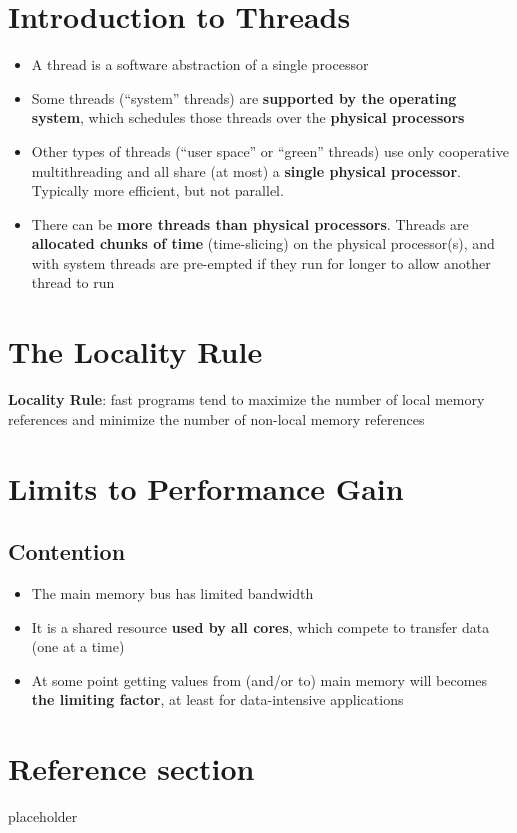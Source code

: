 \documentclass{article}
\begin{document}
\tableofcontents

\newpage

\section{Introduction to Threads}
\begin{itemize}
  \item A thread is a software abstraction of a single processor
  \item Some threads (“system” threads) are \textbf{supported by the operating system}, which schedules those threads over the \textbf{physical processors}
  \item Other types of threads (“user space” or “green” threads) use only cooperative multithreading and all share (at most) a \textbf{single physical processor}. Typically more efficient, but not parallel.
  \item There can be \textbf{more threads than physical processors}. Threads are \textbf{allocated chunks of time} (time-slicing) on the physical processor(s), and with system threads are pre-empted if they run for longer to allow another thread to run
\end{itemize}

\section{The Locality Rule}
\begin{flushleft}
\textbf{Locality Rule}: fast programs tend to maximize the number of local memory references and minimize the number of non-local memory references
\end{flushleft}

\section{Limits to Performance Gain}

\subsection{Contention}
\begin{itemize}
  \item The main memory bus has limited bandwidth 
  \item It is a shared resource \textbf{used by all cores}, which compete to transfer data (one at a time) 
  \item At some point getting values from (and/or to) main memory will becomes \textbf{the limiting factor}, at least for data-intensive applications
\end{itemize}

\pagebreak
\section*{Reference section} \label{sec:reference}
\begin{description}
	\item[placeholder] \hfill \\
\end{description}
\end{document}
